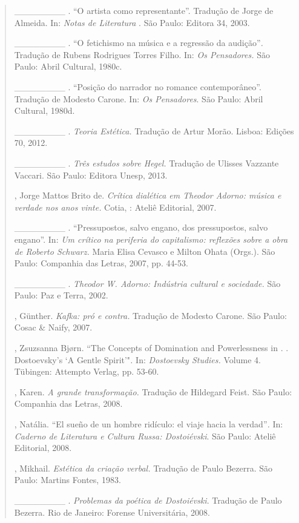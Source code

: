 {\begin{quote}
\begin{Parskip}
\_\_\_\_\_\_\_\_ . ``O artista como representante''. Tradução de Jorge
de Almeida. In: \emph{Notas de Literatura }. São Paulo: Editora 34,
2003.

\_\_\_\_\_\_\_\_ . ``O fetichismo na música e a regressão da
audição''\emph{.} Tradução de Rubens Rodrigues Torres Filho. In:
\emph{Os Pensadores.} São Paulo: Abril Cultural, 1980c.

\_\_\_\_\_\_\_\_ . ``Posição do narrador no romance contemporâneo''.
Tradução de Modesto Carone. In: \emph{Os Pensadores}. São Paulo: Abril
Cultural, 1980d.

\_\_\_\_\_\_\_\_ . \emph{Teoria Estética.} Tradução de Artur Morão.
Lisboa: Edições 70, 2012.

\_\_\_\_\_\_\_\_ . \emph{Três estudos sobre Hegel.} Tradução de Ulisses
Vazzante Vaccari. São Paulo: Editora Unesp, 2013.

, Jorge Mattos Brito de. \emph{Crítica dialética em Theodor
Adorno: música e verdade nos anos vinte.} Cotia, : Ateliê Editorial,
2007.

\_\_\_\_\_\_\_\_ . ``Pressupostos, salvo engano, dos pressupostos, salvo
engano''. In: \emph{Um crítico na periferia do capitalismo: reflexões
sobre a obra de Roberto Schwarz.} Maria Elisa Cevasco e Milton Ohata
(Orgs.). São Paulo: Companhia das Letras, 2007, pp. 44-53.

\_\_\_\_\_\_\_\_ . \emph{Theodor W. Adorno: Indústria cultural e
sociedade.} São Paulo: Paz e Terra, 2002.

, Günther. \emph{Kafka: pró e contra.} Tradução de Modesto Carone.
São Paulo: Cosac \& Naify, 2007.

, Zsuzsanna Bjørn. ``The Concepts of Domination and
Powerlessness in . . Dostoevsky's `A Gentle Spirit'"\emph{.} In:
\emph{Dostoevsky Studies.} Volume 4. Tübingen: Attempto Verlag, pp.
53-60.

, Karen. \emph{A grande transformação.} Tradução de Hildegard
Feist. São Paulo: Companhia das Letras, 2008.

, Natália. ``El sueño de un hombre ridículo: el viaje hacia la
verdad''\emph{.} In: \emph{Caderno de Literatura e Cultura Russa:
Dostoiévski}. São Paulo: Ateliê Editorial, 2008.

, Mikhail. \emph{Estética da criação verbal.} Tradução de Paulo
Bezerra. São Paulo: Martins Fontes, 1983.

\_\_\_\_\_\_\_\_ . \emph{Problemas da poética de Dostoiévski}. Tradução
de Paulo Bezerra. Rio de Janeiro: Forense Universitária, 2008.


\end{Parskip}
\end{quote}}
